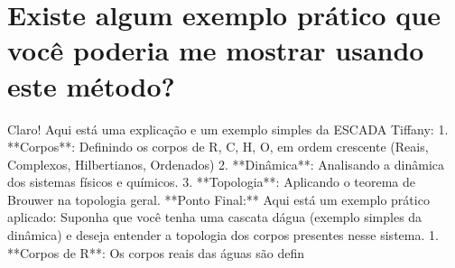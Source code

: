 \documentclass[11pt,a4paper]{article}
\begin{document}
\section{Existe algum exemplo prático que você poderia me mostrar usando este método?}
Claro! Aqui está uma explicação e um exemplo simples da ESCADA Tiffany: 1. **Corpos**: Definindo os corpos de R, C, H, O, em ordem crescente (Reais, Complexos, Hilbertianos, Ordenados) 2. **Dinâmica**: Analisando a dinâmica dos sistemas físicos e químicos. 3. **Topologia**: Aplicando o teorema de Brouwer na topologia geral. **Ponto Final:** Aqui está um exemplo prático aplicado: Suponha que você tenha uma cascata dágua (exemplo simples da dinâmica) e deseja entender a topologia dos corpos presentes nesse sistema. 1. **Corpos de R**: Os corpos reais das águas são defin
\end{document}
